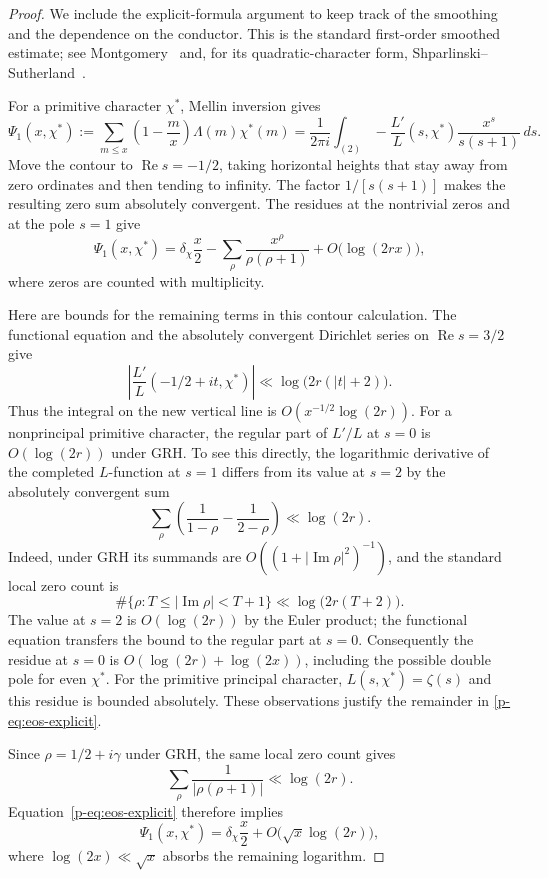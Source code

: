 \documentclass[11pt,a4paper]{article}
\theoremstyle{definition}
\theoremstyle{remark}
\begin{document}
\begin{proof}
We include the explicit-formula argument to keep track of the smoothing
and the dependence on the conductor. This is the standard first-order
smoothed estimate; see Montgomery~\cite[\S13, (13.19)]{p-Montgomery1971}
and, for its quadratic-character form,
Shparlinski--Sutherland~\cite[\S3.1]{p-SS2017}.

For a primitive character $\chi^*$, Mellin inversion gives
\[
 \Psi_1(x,\chi^*)
 :=\sum_{m\leq x}\left(1-\frac mx\right)\Lambda(m)\chi^*(m)
 =\frac1{2\pi i}\int_{(2)}
   -\frac{L'}{L}(s,\chi^*)\frac{x^s}{s(s+1)}\,ds.
\]
Move the contour to $\operatorname{Re}s=-1/2$, taking horizontal
heights that stay away from zero ordinates and then tending to infinity.
The factor $1/[s(s+1)]$ makes the resulting zero sum absolutely
convergent. The residues at the nontrivial zeros and at the pole $s=1$
give
\begin{equation}\label{p-eq:eos-explicit}
 \Psi_1(x,\chi^*)
 =\delta_\chi\frac x2
   -\sum_{\rho}\frac{x^\rho}{\rho(\rho+1)}
   +O\bigl(\log(2rx)\bigr),
\end{equation}
where zeros are counted with multiplicity.

Here are bounds for the remaining terms in this contour calculation.
The functional equation and the absolutely convergent Dirichlet series
on $\operatorname{Re}s=3/2$ give
\[
 \left|\frac{L'}{L}(-1/2+it,\chi^*)\right|
 \ll\log\bigl(2r(|t|+2)\bigr).
\]
Thus the integral on the new vertical line is
$O(x^{-1/2}\log(2r))$. For a nonprincipal primitive character, the
regular part of $L'/L$ at $s=0$ is $O(\log(2r))$ under GRH. To see
this directly, the logarithmic derivative of the completed $L$-function
at $s=1$ differs from its value at $s=2$ by the absolutely convergent
sum
\[
 \sum_\rho\left(\frac1{1-\rho}-\frac1{2-\rho}\right)
 \ll\log(2r).
\]
Indeed, under GRH its summands are $O((1+|\operatorname{Im}\rho|^2)^{-1})$,
and the standard local zero count is
\[
 \#\{\rho:T\leq|\operatorname{Im}\rho|<T+1\}
 \ll\log\bigl(2r(T+2)\bigr).
\]
The value at $s=2$ is $O(\log(2r))$ by the Euler product; the
functional equation transfers the bound to the regular part at $s=0$.
Consequently the residue at $s=0$ is $O(\log(2r)+\log(2x))$, including
the possible double pole for even $\chi^*$. For the primitive principal
character, $L(s,\chi^*)=\zeta(s)$ and this residue is bounded absolutely.
These observations justify the remainder in \eqref{p-eq:eos-explicit}.

Since $\rho=1/2+i\gamma$ under GRH, the same local zero count gives
\[
 \sum_\rho\frac1{|\rho(\rho+1)|}\ll\log(2r).
\]
Equation~\eqref{p-eq:eos-explicit} therefore implies
\[
 \Psi_1(x,\chi^*)
 =\delta_\chi\frac x2+O\bigl(\sqrt{x}\log(2r)\bigr),
\]
where $\log(2x)\ll\sqrt x$ absorbs the remaining logarithm.


\end{proof}
\end{document}
